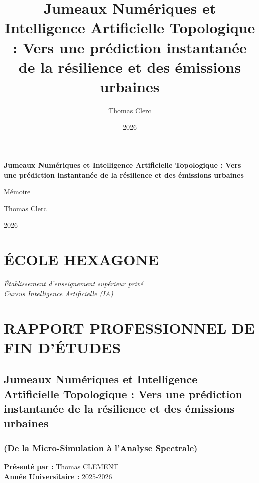 \documentclass[10pt, a4paper]{article}
\title{Jumeaux Numériques et Intelligence Artificielle Topologique :
Vers une prédiction instantanée de la résilience et des émissions
urbaines}
\author{Thomas Clerc}
\date{2026}
\begin{document}
\begin{titlepage}
\centering
\vspace*{2cm}
{\Huge\bfseries Jumeaux Numériques et Intelligence Artificielle
Topologique : Vers une prédiction instantanée de la résilience et des
émissions urbaines\par}
\vspace{1.5cm}
{\Large Mémoire\par}
\vspace{1cm}
{\large Thomas Clerc\par}
\vspace{0.5cm}
{\large 2026\par}
\vfill
\end{titlepage}

\tableofcontents
\newpage

\section{ÉCOLE HEXAGONE}\label{uxe9cole-hexagone}

\emph{Établissement d'enseignement supérieur privé}\\
\emph{Cursus Intelligence Artificielle (IA)}

\section{RAPPORT PROFESSIONNEL DE FIN
D'ÉTUDES}\label{rapport-professionnel-de-fin-duxe9tudes}

\subsection{Jumeaux Numériques et Intelligence Artificielle Topologique
: Vers une prédiction instantanée de la résilience et des émissions
urbaines}\label{jumeaux-numuxe9riques-et-intelligence-artificielle-topologique-vers-une-pruxe9diction-instantanuxe9e-de-la-ruxe9silience-et-des-uxe9missions-urbaines}

\subsubsection{(De la Micro-Simulation à l'Analyse
Spectrale)}\label{de-la-micro-simulation-uxe0-lanalyse-spectrale}

\textbf{Présenté par :} Thomas CLEMENT\\
\textbf{Année Universitaire :} 2025-2026
\end{document}

